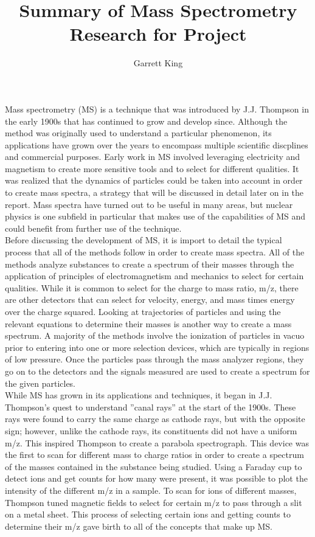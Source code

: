 \documentclass[12pt]{amsart}
\title{Summary of Mass Spectrometry Research for Project}
\author{Garrett King}
\begin{document}
\maketitle

Mass spectrometry (MS) is a technique that was introduced by J.J. Thompson in the early 1900s that has continued to grow and develop since. Although the method was originally used to understand a particular phenomenon, its applications have grown over the years to encompass multiple scientific discplines and commercial purposes. Early work in MS involved leveraging electricity and magnetism to create more sensitive tools and to select for different qualities. It was realized that the dynamics of particles could be taken into account in order to create mass spectra, a strategy that will be discussed in detail later on in the report. \cite{collo} Mass spectra have turned out to be useful in many areas, but nuclear physics is one subfield in particular that makes use of the capabilities of MS and could benefit from further use of the technique.\\

Before discussing the development of MS, it is import to detail the typical process that all of the methods follow in order to create mass spectra. All of the methods analyze substances to create a spectrum of their masses through the application of principles of electromagnetism and mechanics to select for certain qualities.\cite{collo} While it is common to select for the charge to mass ratio, m/z, there are other detectors that can select for velocity, energy, and mass times energy over the charge squared.\cite{AMS} Looking at trajectories of particles and using the relevant equations to determine their masses is another way to create a mass spectrum. A majority of the methods involve the ionization of particles in vacuo prior to entering into one or more selection devices, which are typically in regions of low pressure. Once the particles pass through the mass analyzer regions, they go on to the detectors and the signals measured are used to create a spectrum for the given particles.\cite{collo} \\

While MS has grown in its applications and techniques, it began in J.J. Thompson's quest to understand ''canal rays'' at the start of the 1900s. These rays were found to carry the same charge as cathode rays, but with the opposite sign; however, unlike the cathode rays, its constituents did not have a uniform m/z. This inspired Thompson to create a parabola spectrograph. This device was the first to scan for different mass to charge ratios in order to create a spectrum of the masses contained in the substance being studied. Using a Faraday cup to detect ions and get counts for how many were present, it was possible to plot the intensity of the different m/z in a sample. To scan for ions of different masses, Thompson tuned magnetic fields to select for certain m/z to pass through a slit on a metal sheet. This process of selecting certain ions and getting counts to determine their m/z gave birth to all of the concepts that make up MS.\cite{collo}\\
\end{document}
